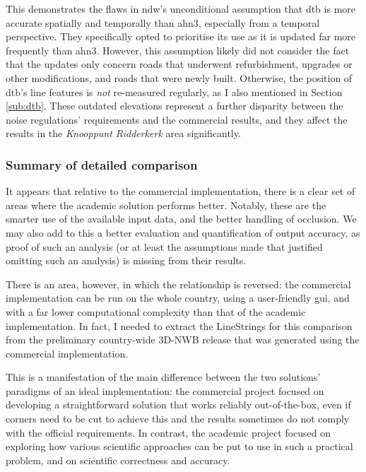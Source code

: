 This demonstrates the flaws in \ac{ndw}'s unconditional assumption that \ac{dtb} is more accurate spatially and temporally than \ac{ahn3}, especially from a temporal perspective. They specifically opted to prioritise its use as it is updated far more frequently than \ac{ahn3}. However, this assumption likely did not consider the fact that the updates only concern roads that underwent refurbishment, upgrades or other modifications, and roads that were newly built. Otherwise, the position of \ac{dtb}'s line features is \textit{not} re-measured regularly, as I also mentioned in Section \ref{sub:dtb}. These outdated elevations represent a further disparity between the noise regulations' requirements and the commercial results, and they affect the results in the \textit{Knooppunt Ridderkerk} area significantly.

\subsubsection{Summary of detailed comparison}

It appears that relative to the commercial implementation, there is a clear set of areas where the academic solution performs better. Notably, these are the smarter use of the available input data, and the better handling of occlusion. We may also add to this a better evaluation and quantification of output accuracy, as proof of such an analysis (or at least the assumptions made that justified omitting such an analysis) is missing from their results. 

There is an area, however, in which the relationship is reversed: the commercial implementation can be run on the whole country, using a user-friendly \ac{gui}, and with a far lower computational complexity than that of the academic implementation. In fact, I needed to extract the LineStrings for this comparison from the preliminary country-wide 3D-NWB release that was generated using the commercial implementation.

This is a manifestation of the main difference between the two solutions' paradigms of an ideal implementation: the commercial project focused on developing a straightforward solution that works reliably out-of-the-box, even if corners need to be cut to achieve this and the results sometimes do not comply with the official requirements. In contrast, the academic project focused on exploring how various scientific approaches can be put to use in such a practical problem, and on scientific correctness and accuracy.

